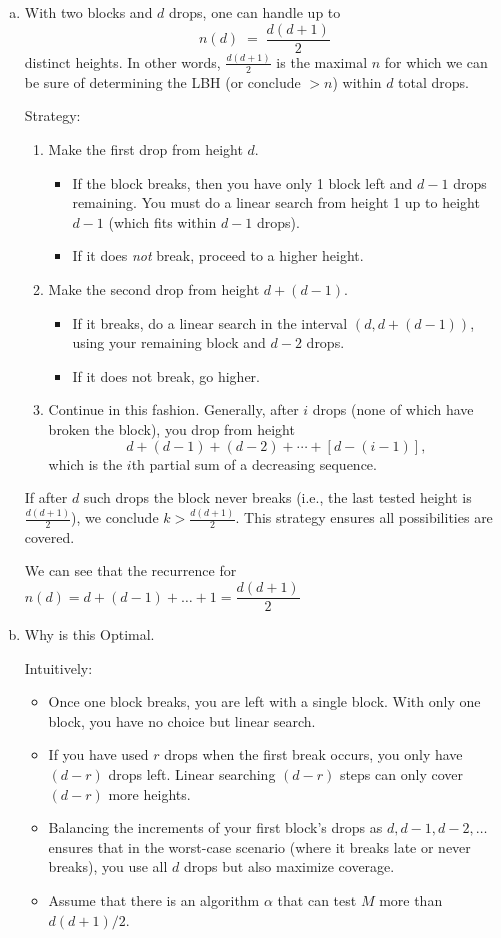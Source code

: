 \documentclass[12pt, letterpaper]{article}
\theoremstyle{definition}
\begin{document}
\begin{enumerate}[(a)]
    \item With two blocks and $d$ drops, one can handle up to
    \[
    n(d) \;=\; \frac{d(d+1)}{2}
    \]
    distinct heights. In other words, \(\tfrac{d(d+1)}{2}\) is the maximal $n$ for which we can be sure of determining the LBH (or conclude $>n$) within $d$ total drops.
    
    Strategy:
    
    \begin{enumerate}[--]
    \item Make the first drop from height $d$. 
      \begin{itemize}
        \item If the block breaks, then you have only 1 block left and $d-1$ drops remaining. You must do a linear search from height 1 up to height $d-1$ (which fits within $d-1$ drops).
        \item If it does \emph{not} break, proceed to a higher height.
      \end{itemize}
    \item Make the second drop from height $d + (d-1)$. 
      \begin{itemize}
        \item If it breaks, do a linear search in the interval $(d,d+(d-1))$, using your remaining block and $d-2$ drops. 
        \item If it does not break, go higher.
      \end{itemize}
    \item Continue in this fashion. Generally, after $i$ drops (none of which have broken the block), you drop from height 
    \[
    d + (d-1) + (d-2) + \cdots + [d-(i-1)],
    \]
    which is the $i$th partial sum of a decreasing sequence. 
    \end{enumerate}
    
    If after $d$ such drops the block never breaks (i.e., the last tested height is $\frac{d(d+1)}{2}$), we conclude $k> \frac{d(d+1)}{2}$. This strategy ensures all possibilities are covered.
    
    We can see that the recurrence for $n(d)=d+(d-1)+\dots+1=\dfrac{d(d+1)}{2}$
    
    \item Why is this Optimal.
    
    Intuitively:
    \begin{itemize}
    \item Once one block breaks, you are left with a single block. With only one block, you have no choice but linear search.
    \item If you have used $r$ drops when the first break occurs, you only have $(d-r)$ drops left. Linear searching $(d-r)$ steps can only cover $(d-r)$ more heights.
    \item Balancing the increments of your first block's drops as $d, d-1, d-2, \dots$ ensures that in the worst-case scenario (where it breaks late or never breaks), you use all $d$ drops but also maximize coverage.
    \item Assume that there is an algorithm $\alpha$ that can test $M$ more than $d(d+1)/2$. 
    

\end{itemize}
\end{enumerate}
\end{document}
